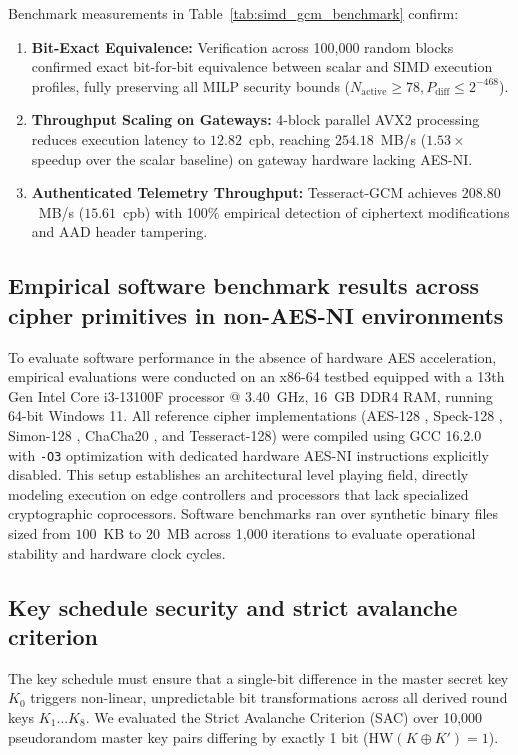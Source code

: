 \documentclass[10pt,twocolumn]{article}
\begin{document}
Benchmark measurements in Table~\ref{tab:simd_gcm_benchmark} confirm:
\begin{enumerate}
    \item \textbf{Bit-Exact Equivalence:} Verification across 100,000 random blocks confirmed exact bit-for-bit equivalence between scalar and SIMD execution profiles, fully preserving all MILP security bounds ($N_{\text{active}} \ge 78, P_{\text{diff}} \le 2^{-468}$).
    \item \textbf{Throughput Scaling on Gateways:} 4-block parallel AVX2 processing reduces execution latency to $12.82$~cpb, reaching $254.18$~MB/s ($1.53\times$ speedup over the scalar baseline) on gateway hardware lacking AES-NI.
    \item \textbf{Authenticated Telemetry Throughput:} Tesseract-GCM achieves $208.80$~MB/s ($15.61$~cpb) with 100\% empirical detection of ciphertext modifications and AAD header tampering.
\end{enumerate}


\subsection{Empirical software benchmark results across cipher primitives in non-AES-NI environments}
\label{sec:experiments}

To evaluate software performance in the absence of hardware AES acceleration, empirical evaluations were conducted on an x86-64 testbed equipped with a 13th Gen Intel Core i3-13100F processor @ 3.40~GHz, 16~GB DDR4 RAM, running 64-bit Windows 11. All reference cipher implementations (AES-128 \cite{nist2001fips}, Speck-128 \cite{beaulieu2015simon}, Simon-128 \cite{beaulieu2015simon}, ChaCha20 \cite{nir2018chacha20}, and Tesseract-128) were compiled using GCC 16.2.0 with \texttt{-O3} optimization with dedicated hardware AES-NI instructions explicitly disabled. This setup establishes an architectural level playing field, directly modeling execution on edge controllers and processors that lack specialized cryptographic coprocessors. Software benchmarks ran over synthetic binary files sized from $100$~KB to $20$~MB across 1,000 iterations to evaluate operational stability and hardware clock cycles.

\subsection{Key schedule security and strict avalanche criterion}
\label{subsec:key_schedule_sac}
The key schedule must ensure that a single-bit difference in the master secret key $K_0$ triggers non-linear, unpredictable bit transformations across all derived round keys $K_1 \dots K_8$. We evaluated the Strict Avalanche Criterion (SAC) \cite{webster1985sac} over 10,000 pseudorandom master key pairs differing by exactly 1 bit ($\text{HW}(K \oplus K') = 1$). 
\end{document}
